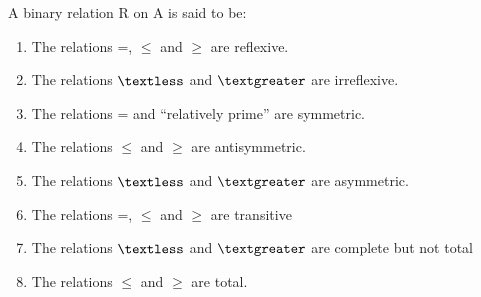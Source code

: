 \documentclass[cn,10pt,math=newtx,citestyle=gb7714-2015,bibstyle=gb7714-2015]{elegantbook}
\begin{document}
\begin{property}
    A binary relation R on A is said to be:

\end{property}

\begin{example}
    \begin{enumerate}
        \item The relations =, $\leq$ and $\ge$ are reflexive.
        \item The relations $\textless$ and $\textgreater$ are irreflexive.
        \item The relations = and “relatively prime” are symmetric.

        \item The relations $\leq$ and $\ge$ are antisymmetric.
        \item The relations $\textless$ and $\textgreater$ are asymmetric.
        \item The relations =, $\leq$ and $\ge$ are transitive
        \item The relations $\textless$ and $\textgreater$  are complete but not total
        \item The relations $\leq$ and $\ge$ are total. 
        
    \end{enumerate}
\end{example}
\end{document}
